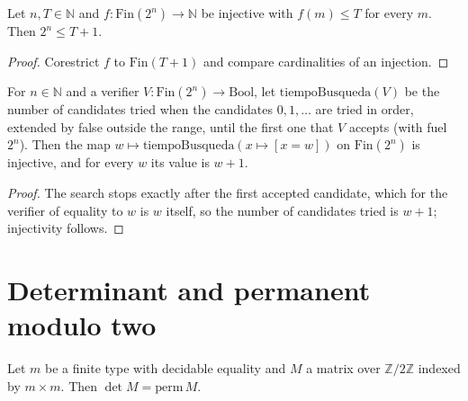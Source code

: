 \begin{theorem}
  \label{thm:information-time-channel}
  \leanok
  Let $n, T \in \mathbb{N}$ and $f : \mathrm{Fin}(2^n) \to \mathbb{N}$ be injective with $f(m) \le T$
  for every $m$. Then $2^n \le T + 1$.
  \own{}
\end{theorem}

\begin{proof}
  \leanok
  Corestrict $f$ to $\mathrm{Fin}(T + 1)$ and compare cardinalities of an injection.
\end{proof}

\begin{theorem}
  \label{thm:information-search-encodes}
  \leanok
  For $n \in \mathbb{N}$ and a verifier $V : \mathrm{Fin}(2^n) \to \mathrm{Bool}$, let
  $\mathrm{tiempoBusqueda}(V)$ be the number of candidates tried when the candidates $0, 1, \dots$
  are tried in order, extended by false outside the range, until the first one that $V$ accepts
  (with fuel $2^n$). Then the map $w \mapsto \mathrm{tiempoBusqueda}(x \mapsto [x = w])$ on
  $\mathrm{Fin}(2^n)$ is injective, and for every $w$ its value is $w + 1$.
  \own{}
\end{theorem}

\begin{proof}
  \leanok
  The search stops exactly after the first accepted candidate, which for the verifier of equality to
  $w$ is $w$ itself, so the number of candidates tried is $w + 1$; injectivity follows.
\end{proof}

\section{Determinant and permanent modulo two}
\label{sec:information-det-perm}

\begin{theorem}
  \label{thm:information-det-perm}
  \leanok
  Let $m$ be a finite type with decidable equality and $M$ a matrix over $\mathbb{Z}/2\mathbb{Z}$
  indexed by $m \times m$. Then $\det M = \mathrm{perm}\, M$.
\end{theorem}

